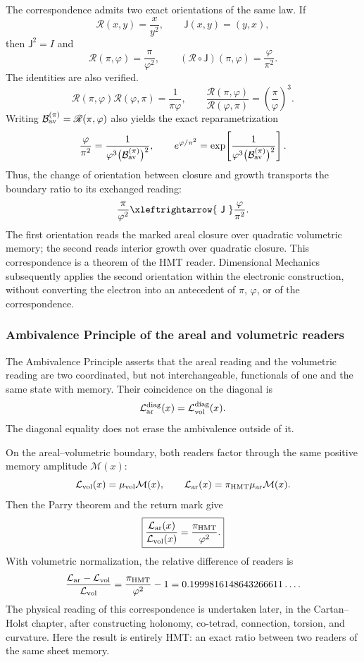The correspondence admits two exact orientations of the same law. If
\[
 \mathscr R(x,y)=\frac{x}{y^2},
 \qquad
 \mathsf J(x,y)=(y,x),
\]
then \(\mathsf J^2=I\) and
\[
 \mathscr R(\pi,\varphi)=\frac{\pi}{\varphi^2},
 \qquad
 (\mathscr R\circ\mathsf J)(\pi,\varphi)
 =\frac{\varphi}{\pi^2}.
\]
The identities are also verified.
\[
 \mathscr R(\pi,\varphi)\mathscr R(\varphi,\pi)
 =\frac1{\pi\varphi},
 \qquad
 \frac{\mathscr R(\pi,\varphi)}
 {\mathscr R(\varphi,\pi)}
 =\left(\frac{\pi}{\varphi}\right)^3.
\]
Writing
\(\mathcal B_{\rm av}^{(\pi)}=\mathscr R(\pi,\varphi)\) also yields
the exact reparametrization
\[
 \frac{\varphi}{\pi^2}
 =
 \frac1{\varphi^3
 \bigl(\mathcal B_{\rm av}^{(\pi)}\bigr)^2},
 \qquad
 e^{\varphi/\pi^2}
 =
 \exp\!\left[
 \frac1{\varphi^3
 \bigl(\mathcal B_{\rm av}^{(\pi)}\bigr)^2}
 \right].
\]
Thus, the change of orientation between closure and growth transports the
boundary ratio to its exchanged reading:
\[
 \frac{\pi}{\varphi^2}
 \xleftrightarrow{\ \mathsf J\ }
 \frac{\varphi}{\pi^2}.
\]
The first orientation reads the marked areal closure over quadratic
volumetric memory; the second reads interior growth over
quadratic closure. This correspondence is a theorem of the HMT reader. Dimensional Mechanics subsequently applies the second orientation within the
electronic construction, without converting the electron into an antecedent of
\(\pi\), \(\varphi\), or of the correspondence.

\subsubsection{Ambivalence Principle of the areal and volumetric readers}
\label{p12-83-c16-s2:sec:ambivalencia-grav-inercial-pi-phi2}

The Ambivalence Principle asserts that the areal reading and the
volumetric reading are two coordinated, but not interchangeable, functionals of one
and the same state with memory. Their coincidence on the diagonal is
\[
 \mathcal L_{\rm ar}^{\rm diag}(x)
 =\mathcal L_{\rm vol}^{\rm diag}(x).
\]
The diagonal equality does not erase the ambivalence outside of it.

On the areal--volumetric boundary, both readers factor through the same
positive memory amplitude \(\mathcal M(x)\):
\[
 \mathcal L_{\rm vol}(x)=\mu_{\rm vol}\mathcal M(x),
 \qquad
 \mathcal L_{\rm ar}(x)=
 \pi_{\rm HMT}\mu_{\rm ar}\mathcal M(x).
\]
Then the Parry theorem and the return mark give
\[
 \boxed{\displaystyle
 \frac{\mathcal L_{\rm ar}(x)}
 {\mathcal L_{\rm vol}(x)}
 =\frac{\pi_{\rm HMT}}{\varphi^2}.}
\]
With volumetric normalization, the relative difference of readers is
\[
 \frac{\mathcal L_{\rm ar}-\mathcal L_{\rm vol}}
 {\mathcal L_{\rm vol}}
 =
 \frac{\pi_{\rm HMT}}{\varphi^2}-1
 =
 0.1999816148643266611\ldots.
\]
The physical reading of this correspondence is undertaken later, in the
Cartan--Holst chapter, after constructing holonomy, co-tetrad, connection, torsion,
and curvature. Here the result is entirely HMT: an exact ratio between
two readers of the same sheet memory.

